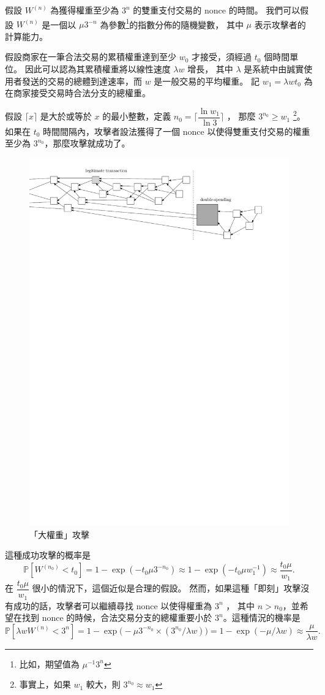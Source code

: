 \documentclass[12pt]{article}
\newcommand{\IP}{\mathbb{P}}
\begin{document}
\begin{CJK}{UTF8}{bkai}
假設 $W^{(n)}$ 為獲得權重至少為 $3^n$ 的雙重支付交易的 nonce 的時間。
我們可以假設 $W^{(n)}$ 是一個以 $\mu3^{-n}$ 為參數\footnote{比如，期望值為 $\mu^{-1}3^{n}$ }的指數分佈的隨機變數，
其中 $\mu$ 表示攻擊者的計算能力。

假設商家在一筆合法交易的累積權重達到至少 $w_0$ 才接受，須經過 $t_0$ 個時間單位。
因此可以認為其累積權重將以線性速度 $\lambda w$ 增長，
其中 $\lambda$ 是系統中由誠實使用者發送的交易的總體到達速率，而 $w$ 是一般交易的平均權重。
記 $w_1=\lambda wt_0$ 為在商家接受交易時合法分支的總權重。

假設 $\lceil x\rceil$ 是大於或等於 $x$ 的最小整數，定義 $n_0=\lceil\dfrac{\ln{w_1}}{\ln3}\rceil$ ，
那麼 $3^{n_0}\geq w_1$ \footnote{事實上，如果 $w_1$ 較大，則 $3^{n_0}\approx w_1$ }。
如果在 $t_0$  時間間隔內，攻擊者設法獲得了一個 nonce 以使得雙重支付交易的權重至少為 $3^{n_0}$，那麼攻擊就成功了。
\begin{figure}
  \centering \includegraphics[width=\textwidth]{bigPoW} 
 \caption{「大權重」攻擊}
 \label{f_bigPoW}
 \end{figure}
這種成功攻擊的概率是
\[
 \IP[W^{(n_0)}<t_0]=1-\exp(-t_0\mu 3^{-n_0})
  \approx 1-\exp(-t_0\mu w_1^{-1})
  \approx \frac{t_0\mu}{w_1}.
\]
在 $\dfrac{t_0\mu}{w_1}$ 很小的情況下，這個近似是合理的假設。
然而，如果這種「即刻」攻擊沒有成功的話，攻擊者可以繼續尋找 nonce 以使得權重為 $3^n$ ，
其中 $n>n_0$，並希望在找到 nonce 的時候，合法交易分支的總權重要小於 $3^n$。這種情況的機率是
\[
 \IP[\lambda w W^{(n)}<3^n]
=1-\exp\big(-\mu 3^{-n_0}\times (3^{n_0}/\lambda w)\big)
  = 1-\exp(- \mu/\lambda w)
  \approx \frac{\mu}{\lambda w}.
\]


\end{CJK}
\end{document}

